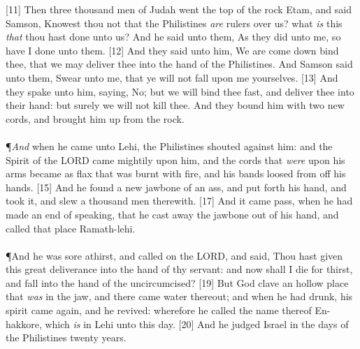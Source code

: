 [11] \textcolor[cmyk]{0.99998,1,0,0}{Then three thousand men of Judah went  the top of the rock Etam, and said  Samson, Knowest thou not that the Philistines \emph{are} rulers over us? what \emph{is} this \emph{that} thou hast done unto us? And he said unto them, As they did unto me, so have I done unto them.}
[12] \textcolor[cmyk]{0.99998,1,0,0}{And they said unto him, We are come down  bind thee, that we may deliver thee into the hand of the Philistines. And Samson said unto them, Swear unto me, that ye will not fall upon me yourselves.}
[13] \textcolor[cmyk]{0.99998,1,0,0}{And they spake unto him, saying, No; but we will bind thee fast, and deliver thee into their hand: but surely we will not kill thee. And they bound him with two new cords, and brought him up from the rock.}\\
\\
\P \textcolor[cmyk]{0.99998,1,0,0}{\emph{And} when he came unto Lehi, the Philistines shouted against him: and the Spirit of the LORD came mightily upon him, and the cords that \emph{were} upon his arms became as flax that was burnt with fire, and his bands loosed from off his hands.}
[15] \textcolor[cmyk]{0.99998,1,0,0}{And he found a new jawbone of an ass, and put forth his hand, and took it, and slew a thousand men therewith.}
[17] \textcolor[cmyk]{0.99998,1,0,0}{And it came  pass, when he had made an end of speaking, that he cast away the jawbone out of his hand, and called that place Ramath-lehi.}\\
\\
\P \textcolor[cmyk]{0.99998,1,0,0}{And he was sore athirst, and called on the LORD, and said, Thou hast given this great deliverance into the hand of thy servant: and now shall I die for thirst, and fall into the hand of the uncircumcised?}
[19] \textcolor[cmyk]{0.99998,1,0,0}{But God clave an hollow place that \emph{was} in the jaw, and there came water thereout; and when he had drunk, his spirit came again, and he revived: wherefore he called the name thereof En-hakkore, which \emph{is} in Lehi unto this day.}
[20] \textcolor[cmyk]{0.99998,1,0,0}{And he judged Israel in the days of the Philistines twenty years.}